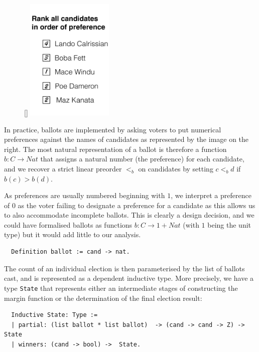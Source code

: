 \begin{figure}
  \begin{center}
    \raisebox{0pt}[\dimexpr{}\baselineskip\relax]
    {\includegraphics[width=0.37\textwidth]{bal-cropped.pdf}}
    \vspace*{-8ex}
  \end{center}
\end{figure}
In practice, ballots are
implemented by asking voters to put numerical preferences against
the names of candidates as represented by the image on the right.
The most natural representation of a ballot is therefore a function
$b: C \to Nat$ that assigns a natural number (the preference) for
each candidate, and we recover a strict linear preorder $<_b$ on candidates
by setting $c <_b d$ if $b(c) > b(d)$. 

As preferences are usually
numbered beginning with $1$, we interpret a preference of $0$ as the
voter failing to designate a preference for a candidate
as this allows us to also accommodate incomplete ballots.
This is clearly a design decision, and we could have formalised
ballots as functions $b: C \to 1 + Nat$ (with $1$ being the unit
type) but it would add little to our analysis.
%
%
\begin{verbatim}
  Definition ballot := cand -> nat.
\end{verbatim}

\noindent
The count of an individual election is then parameterised by the list
of ballots cast, and is represented as a dependent inductive type.
More precisely, we have a type \texttt{State} that represents either
an
intermediate stages of constructing the margin function or the
determination of the final election result:
\begin{verbatim}
  Inductive State: Type :=
  | partial: (list ballot * list ballot)  -> (cand -> cand -> Z) -> State
  | winners: (cand -> bool) ->  State.
\end{verbatim}

